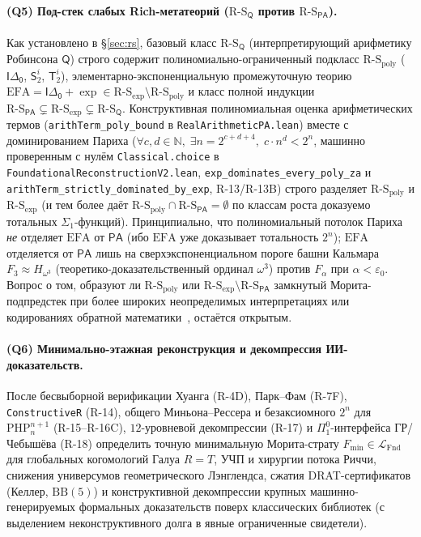 \documentclass[11pt]{article}
\theoremstyle{plain}
\theoremstyle{definition}
\newcommand{\RS}{\mathrm{R\text{-}S}}
\newcommand{\LFnd}{\mathcal{L}_{\mathrm{Fnd}}}
\newcommand{\PA}{\mathsf{PA}}
\begin{document}
\paragraph{(Q5) Под-стек слабых Rich-метатеорий ($\RS_{\mathsf{Q}}$ против $\RS_{\PA}$).} Как установлено в \S\ref{sec:rs}, базовый класс $\RS_{\mathsf{Q}}$ (интерпретирующий арифметику Робинсона $\mathsf{Q}$) строго содержит полиномиально-ограниченный подкласс $\RS_{\mathrm{poly}}$ ($\mathsf{I\Delta_0}$, $\mathsf{S}_2^i$, $\mathsf{T}_2^i$), элементарно-экспоненциальную промежуточную теорию $\mathrm{EFA} = \mathsf{I\Delta_0} + \exp \in \RS_{\exp} \setminus \RS_{\mathrm{poly}}$ и класс полной индукции $\RS_{\PA} \subsetneq \RS_{\exp} \subsetneq \RS_{\mathsf{Q}}$. Конструктивная полиномиальная оценка арифметических термов (\texttt{arithTerm\_\allowbreak poly\_\allowbreak bound} в \texttt{RealArithmeticPA.lean}) вместе с доминированием Париха ($\forall c, d \in \mathbb{N},\; \exists n = 2^{c+d+4},\; c \cdot n^d < 2^n$, машинно проверенным с нулём \texttt{Classical.choice} в \texttt{FoundationalReconstructionV2.lean}, \texttt{exp\_\allowbreak dominates\_\allowbreak every\_\allowbreak poly\_\allowbreak za} и \texttt{arithTerm\_\allowbreak strictly\_\allowbreak dominated\_\allowbreak by\_\allowbreak exp}, R-13/R-13B) строго разделяет $\RS_{\mathrm{poly}}$ и $\RS_{\exp}$ (и тем более даёт $\RS_{\mathrm{poly}} \cap \RS_{\PA} = \emptyset$ по классам роста доказуемо тотальных $\Sigma_1$-функций). Принципиально, что полиномиальный потолок Париха \emph{не} отделяет $\mathrm{EFA}$ от $\PA$ (ибо $\mathrm{EFA}$ уже доказывает тотальность $2^n$); $\mathrm{EFA}$ отделяется от $\PA$ лишь на сверхэкспоненциальном пороге башни Кальмара $F_3 \approx H_{\omega^3}$ (теоретико-доказательственный ординал $\omega^3$) против $F_\alpha$ при $\alpha < \varepsilon_0$. Вопрос о том, образуют ли $\RS_{\mathrm{poly}}$ или $\RS_{\exp} \setminus \RS_{\PA}$ замкнутый Морита-подпредстек при более широких неопределимых интерпретациях или кодированиях обратной математики~\cite{Simpson2009}, остаётся открытым.

\paragraph{(Q6) Минимально-этажная реконструкция и декомпрессия ИИ-доказательств.} После бесвыборной верификации Хуанга (R-4D), Парк--Фам (R-7F), \texttt{ConstructiveR} (R-14), общего Миньона--Рессера и безаксиомного $2^n$ для $\mathrm{PHP}_n^{n+1}$ (R-15--R-16C), $12$-уровневой декомпрессии (R-17) и $\Pi^0_1$-интерфейса ГР/Чебышёва (R-18) определить точную минимальную Морита-страту $F_{\min} \in \LFnd$ для глобальных когомологий Галуа $R = T$, УЧП и хирургии потока Риччи, снижения универсумов геометрического Лэнглендса, сжатия DRAT-сертификатов (Келлер, $\mathrm{BB}(5)$) и конструктивной декомпрессии крупных машинно-генерируемых формальных доказательств поверх классических библиотек (с выделением неконструктивного долга в явные ограниченные свидетели).
\end{document}
